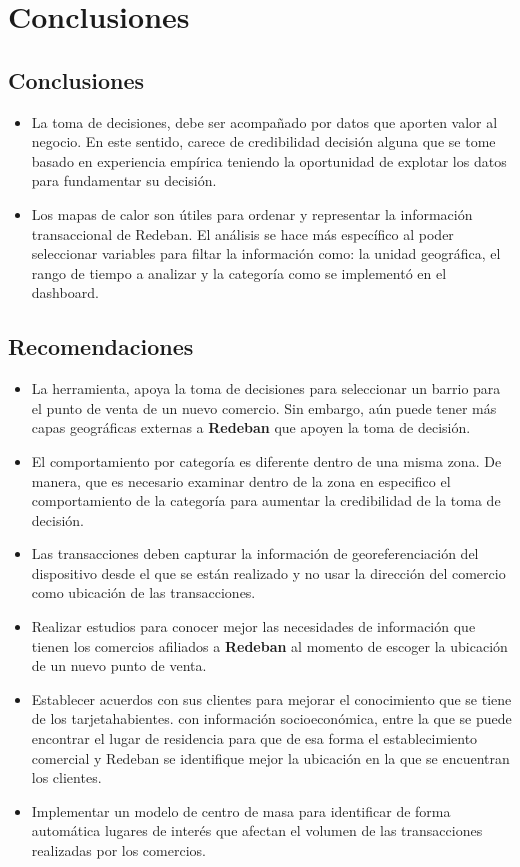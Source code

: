 \documentclass[a4paper]{article}
\begin{document}
\section{Conclusiones}
\subsection{Conclusiones}

\begin{itemize}
	\item La toma de decisiones, debe ser acompañado por datos que aporten valor al negocio. En este sentido, carece de credibilidad decisión alguna que se tome basado en experiencia empírica teniendo la oportunidad de explotar los datos para fundamentar su decisión.
	\item Los mapas de calor son útiles para ordenar y representar la información transaccional de Redeban. El análisis se hace más específico al poder seleccionar variables para filtar la información como: la unidad geográfica, el rango de tiempo a analizar y la categoría como se implementó en el dashboard.
\end{itemize}

\subsection{Recomendaciones}
\begin{itemize}
	\item La herramienta, apoya la toma de decisiones para seleccionar un barrio para el punto de venta de un nuevo comercio. Sin embargo, aún puede tener más capas geográficas externas a \textbf{Redeban} que apoyen la toma de decisión.
	\item El comportamiento por categoría es diferente dentro de una misma zona. De manera, que es necesario examinar dentro de la zona en especifico el comportamiento de la categoría para aumentar la credibilidad de la toma de decisión.
	\item Las transacciones deben capturar la información de georeferenciación del dispositivo desde el que se están realizado y no usar la dirección del comercio como ubicación de las transacciones.
	\item Realizar estudios para conocer mejor las necesidades de información que tienen los comercios afiliados a \textbf{Redeban} al momento de escoger la ubicación de un nuevo punto de venta.
	\item Establecer acuerdos con sus clientes para mejorar el conocimiento que se tiene de los tarjetahabientes. con información socioeconómica, entre la que se puede encontrar el lugar de residencia para que de esa forma el establecimiento comercial y Redeban se identifique mejor la ubicación en la que se encuentran los clientes.
	\item Implementar un modelo de centro de masa para identificar de forma automática lugares de interés que afectan el volumen de las transacciones realizadas por los comercios.
\end{itemize}

\newpage

\printbibliography
\end{document}
